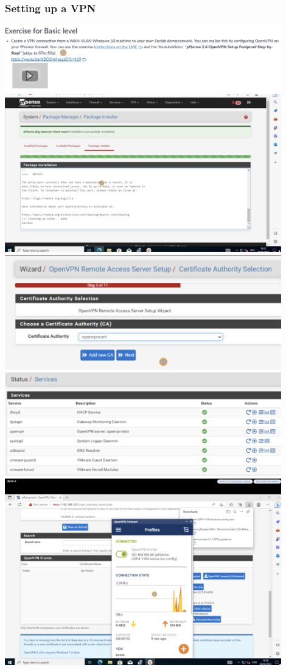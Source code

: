 \documentclass[12pt, letterpaper]{article}
\begin{document}
\subsubsection{Setting up a VPN}
\includegraphics[width=0.9\textwidth]{fotos/Week 6/Vpn basic level.jpeg}
\hfill\break
\includegraphics[width=0.9\textwidth]{fotos/Week 6/Vpn/OpenVPN exporter .jpeg}
\hfill\break
\hfill\break
\includegraphics[width=0.9\textwidth]{fotos/Week 6/Vpn/Setting up servercert.jpeg}
\hfill\break
\hfill\break
\includegraphics[width=0.9\textwidth]{fotos/Week 6/Vpn/Vpn status.jpeg}\
\hfill\break
\hfill\break
\includegraphics[width=0.9\textwidth]{fotos/Week 6/Vpn/Vpn connect succesfull.jpeg}
\end{document}
